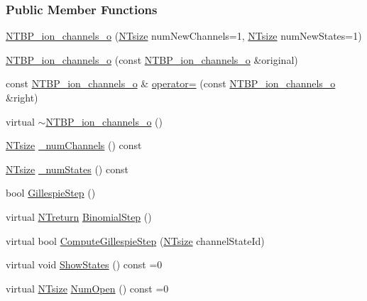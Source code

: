 \subsubsection*{Public Member Functions}
\begin{DoxyCompactItemize}
\item 
\hyperlink{class_n_t_b_p__ion__channels__o_ade7da2e7c295b74a09d468ac850b8db1}{NTBP\_\-ion\_\-channels\_\-o} (\hyperlink{nt__types_8h_a06c124f2e4469769b58230253ce0560b}{NTsize} numNewChannels=1, \hyperlink{nt__types_8h_a06c124f2e4469769b58230253ce0560b}{NTsize} numNewStates=1)
\item 
\hyperlink{class_n_t_b_p__ion__channels__o_af82d158610b12d1d5aaa2c2035c8d15c}{NTBP\_\-ion\_\-channels\_\-o} (const \hyperlink{class_n_t_b_p__ion__channels__o}{NTBP\_\-ion\_\-channels\_\-o} \&original)
\item 
const \hyperlink{class_n_t_b_p__ion__channels__o}{NTBP\_\-ion\_\-channels\_\-o} \& \hyperlink{class_n_t_b_p__ion__channels__o_a5da879b729ce1001963b84b4620c1641}{operator=} (const \hyperlink{class_n_t_b_p__ion__channels__o}{NTBP\_\-ion\_\-channels\_\-o} \&right)
\item 
virtual \hyperlink{class_n_t_b_p__ion__channels__o_a1406ae70ceb537a41d4e7c755a60dc01}{$\sim$NTBP\_\-ion\_\-channels\_\-o} ()
\item 
\hyperlink{nt__types_8h_a06c124f2e4469769b58230253ce0560b}{NTsize} \hyperlink{class_n_t_b_p__ion__channels__o_ac7d73247fc96b26c28ca6c0bc0482410}{\_\-numChannels} () const 
\item 
\hyperlink{nt__types_8h_a06c124f2e4469769b58230253ce0560b}{NTsize} \hyperlink{class_n_t_b_p__ion__channels__o_a0f713bc04c573ed0a887f734c9dcf5d4}{\_\-numStates} () const 
\item 
bool \hyperlink{class_n_t_b_p__ion__channels__o_a8e477f6a69715687a7dd60e5af9245c4}{GillespieStep} ()
\item 
virtual \hyperlink{nt__types_8h_ab9564ee8f091e809d21b8451c6683c53}{NTreturn} \hyperlink{class_n_t_b_p__ion__channels__o_a2f8fe07b7beaf904ffde81f8ec0c7009}{BinomialStep} ()
\item 
virtual bool \hyperlink{class_n_t_b_p__ion__channels__o_ad6e7f2db87a1b72afb707424d3fd3d12}{ComputeGillespieStep} (\hyperlink{nt__types_8h_a06c124f2e4469769b58230253ce0560b}{NTsize} channelStateId)
\item 
virtual void \hyperlink{class_n_t_b_p__ion__channels__o_a6732284521ed7491232fb3a9e4b034ef}{ShowStates} () const =0
\item 
virtual \hyperlink{nt__types_8h_a06c124f2e4469769b58230253ce0560b}{NTsize} \hyperlink{class_n_t_b_p__ion__channels__o_a01b5d9b7fdf0526a276e9eb871003738}{NumOpen} () const =0

\end{DoxyCompactItemize}
